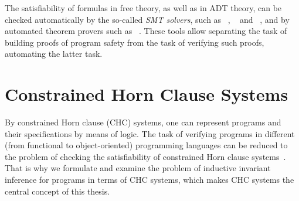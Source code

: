 The satisfiability of formulas in free theory, as well as in ADT theory, can be checked automatically by the so-called \emph{SMT solvers}, such as \zprover{}~\cite{de2008z3}, \cvc{}~\cite{cvc5} and \princess{}~\cite{princess}, and by automated theorem provers such as \vampire{}~\cite{reger2017instantiation}.
These tools allow separating the task of building proofs of program safety from the task of verifying such proofs, automating the latter task.

\section{Constrained Horn Clause Systems}\label{sec:background/Horn}
By constrained Horn clause (CHC) systems, one can represent programs and their specifications by means of logic.
The task of verifying programs in different (from functional to object-oriented) programming languages can be reduced to the problem of checking the satisfiability of constrained Horn clause systems~\cite{Bjorner2015}.
That is why we formulate and examine the problem of inductive invariant inference for programs in terms of CHC systems, which makes CHC systems the central concept of this thesis.

